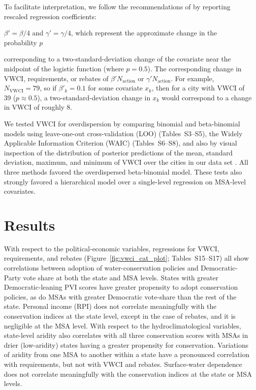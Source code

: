 \documentclass[draft,linenumbers]{agujournal}
\begin{document}
To facilitate interpretation, we
follow the recommendations of \citet[pp.~81--82]{gelman:arm:2007} by reporting
rescaled regression coefficients:
\iffalse
$\beta' = N_{\text{action}} \beta / 4$ and $\gamma' = N_{\text{action}} \gamma / 4$,
which represent the approximate change in VWCI (or requirements or rebates)
\else
$\beta' = \beta / 4$ and $\gamma' = \gamma / 4$, which represent
the approximate change in the probability $p$
\fi
corresponding to
a two-standard-deviation change of the covariate near the
midpoint of the logistic function (where $p = 0.5$).
The corresponding change in VWCI, requirements, or rebates
of
$\beta' N_{\text{action}}$ or $\gamma' N_{\text{action}}$.
For example, $N_{\text{VWCI}} = 79$,
so if $\beta'_k = 0.1$ for some covariate $x_k$,
then for a city
with VWCI of 39 ($p \approx 0.5$),
a two-standard-deviation change in $x_k$ would correspond
to a change in VWCI of roughly 8.

We tested VWCI for overdispersion by comparing binomial and beta-binomial models
using leave-one-out cross-validation (LOO)
(Tables~S3--S5),
the Widely Applicable Information Criterion (WAIC)
(Tables~S6--S8),
and also by visual inspection of the distribution of posterior predictions of
the mean, standard deviation, maximum, and minimum of VWCI over the cities in
our data set \citep{gelman:bda:2014,gelman:predictive:2014,vehtari:loo:2016}.
All three methods favored the overdispersed beta-binomial model.
These tests also strongly favored a
hierarchical
model over a single-level regression on MSA-level covariates.

\section{Results}
With respect to the political-economic variables, regressions
for VWCI, requirements, and rebates
(Figure~\ref{fig:vwci_cat_plot}; Tables~S15--S17)
all show correlations between
adoption of water-conservation policies and Democratic-Party vote share
at both the state and MSA levels.
States with greater Democratic-leaning PVI scores have greater propensity to adopt conservation policies,
as do MSAs with greater Democratic vote-share than the rest of the state.
Personal income (RPI) does not correlate meaningfully with the conservation indices at the state level, except in the
case of rebates, and it is negligible at the MSA level.
With respect to the hydroclimatological variables, state-level
aridity also correlates with all three conservation scores
with MSAs in drier (low-aridity) states having a greater propensity for conservation.
Variations of aridity from one MSA to another within a state have a pronounced
correlation with requirements, but not with VWCI and rebates.
Surface-water dependence does not correlate meaningfully with the conservation indices
at the state or MSA levels.
\end{document}
